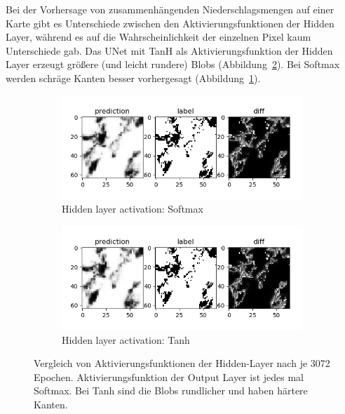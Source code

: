 Bei der Vorhersage von zusammenhängenden Niederschlagsmengen auf einer Karte gibt es Unterschiede zwischen den Aktivierungsfunktionen der Hidden Layer, während es auf die Wahrscheinlichkeit der einzelnen Pixel kaum Unterschiede gab.
Das UNet mit TanH als Aktivierungsfunktion der Hidden Layer erzeugt größere (und leicht rundere) Blobs (Abbildung~\ref{fig:hiddenActivationTanh}). Bei Softmax werden schräge Kanten besser vorhergesagt (Abbildung~\ref{fig:hiddenActivationSoftmax}).
\begin{figure}[ht]
\centering
\begin{subfigure}{0.5\textwidth}
\centering
\includegraphics[width=\linewidth]{pics/categorical_crossentropy_hidden-softmax_output-softmax_above_3072}
\caption{Hidden layer activation: Softmax}
\label{fig:hiddenActivationSoftmax}
\end{subfigure}%
\begin{subfigure}{0.5\textwidth}
\centering
\includegraphics[width=\linewidth]{pics/categorical_crossentropy_hidden-tanh_output-softmax_above_3072}
\caption{Hidden layer activation: Tanh}
\label{fig:hiddenActivationTanh}
\end{subfigure}%
\caption[Vergleich von Aktivierungsfunktionen der Hidden-Layer]{Vergleich von Aktivierungsfunktionen der Hidden-Layer nach je 3072 Epochen. Aktivierungsfunktion der Output Layer ist jedes mal Softmax. Bei Tanh sind die Blobs rundlicher und haben härtere Kanten.}
\label{fig:activatinHidden}
\end{figure}


